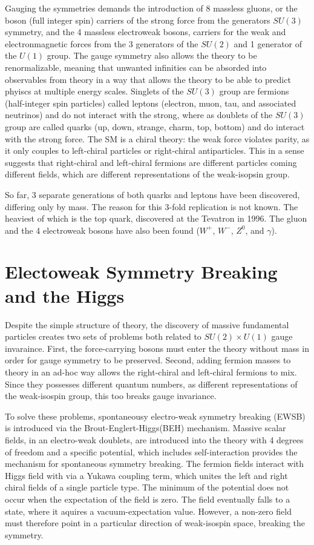 Gauging the symmetries demands the introduction of 8 massless gluons, or the
boson (full integer spin) carriers of the strong force from the generators
$SU(3)$ symmetry, and the 4 massless electroweak bosons, carriers for the weak
and electronmagnetic forces from the 3 generators of the $SU(2)$ and 1
generator of the $U(1)$ group. The gauge symmetry also allows the theory to be
renormalizable, meaning that unwanted infinities can be absorded into
observables from theory in a way that allows the theory to be able to predict
phyiscs at multiple energy scales.  Singlets of the $SU(3)$ group are fermions
(half-integer spin particles) called leptons (electron, muon, tau, and
    associated neutrinos) and do not interact with the strong, where as
doublets of the $SU(3)$ group are called quarks (up, down, strange, charm, top,
    bottom) and do interact with the strong force. The SM is a chiral theory:
the weak force violates parity, as it only couples to left-chiral particles or
right-chiral antiparticles. This in a sense suggests that right-chiral and
left-chiral fermions are different particles coming different fields, which are
different representations of the weak-isopsin group.

So far, 3 separate generations of both quarks and leptons have been discovered,
   differing only by mass. The reason for this 3-fold replication is not known.
   The heaviest of which is the top quark, discovered at the Tevatron in 1996.
   The gluon and the 4 electroweak bosons have also been found ($W^+$, $W^-$,
       $Z^0$, and $\gamma$). 


\section{Electoweak Symmetry Breaking and the Higgs}

Despite the simple structure of theory, the discovery of massive fundamental
particles creates two sets of problems both related to $SU(2) \times U(1)$
gauge invaraince. First, the force-carrying bosons must enter the theory
without mass in order for gauge symmetry to be preserved. Second, adding
fermion masses to theory in an ad-hoc way allows the right-chiral and
left-chiral fermions to mix. Since they possesses different quantum numbers, as
different representations of the weak-isospin group, this too breaks gauge
invariance. 

To solve these problems, spontaneousy electro-weak symmetry breaking (EWSB) is
introduced via the Brout-Englert-Higgs(BEH) mechanism. Massive scalar fields,
in an electro-weak doublets, are introduced into the theory with 4
degrees of freedom and a specific potential, which includes
self-interaction provides the mechanism for spontaneous symmetry
breaking. The fermion fields interact with Higgs field with via a
Yukawa coupling term, which unites the left and right chiral fields
of a single particle type.  The minimum of the potential does not
occur when the expectation of the field is zero. The field
eventually falls to a state, where it aquires a vacuum-expectation
value. However, a non-zero field must therefore point in a
particular direction of weak-isospin space, breaking the symmetry.

